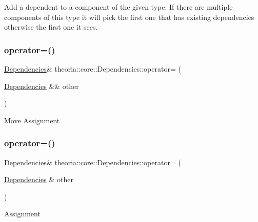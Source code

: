 Add a dependent to a component of the given type. If there are multiple components of this type it will pick the first one that has existing dependencies otherwise the first one it sees. \mbox{\label{classtheoria_1_1core_1_1Dependencies_ac1b06e338d69428c95de7851dfc43935}} 
\subsubsection{\texorpdfstring{operator=()}{operator=()}\hspace{0.1cm}{\footnotesize\ttfamily [1/2]}}
{\footnotesize\ttfamily \hyperlink{classtheoria_1_1core_1_1Dependencies}{Dependencies}\& theoria\+::core\+::\+Dependencies\+::operator= (\begin{DoxyParamCaption}\item[{\hyperlink{classtheoria_1_1core_1_1Dependencies}{Dependencies} \&\&}]{other }\end{DoxyParamCaption})\hspace{0.3cm}{\ttfamily [default]}}

Move Assignment \mbox{\label{classtheoria_1_1core_1_1Dependencies_ac0c7b2c350c5e904732ed07b13852c21}} 
\subsubsection{\texorpdfstring{operator=()}{operator=()}\hspace{0.1cm}{\footnotesize\ttfamily [2/2]}}
{\footnotesize\ttfamily \hyperlink{classtheoria_1_1core_1_1Dependencies}{Dependencies}\& theoria\+::core\+::\+Dependencies\+::operator= (\begin{DoxyParamCaption}\item[{\hyperlink{classtheoria_1_1core_1_1Dependencies}{Dependencies} \&}]{other }\end{DoxyParamCaption})\hspace{0.3cm}{\ttfamily [default]}}

Assignment \mbox{\label{classtheoria_1_1core_1_1Dependencies_afba2a36945b9320b793ff8f3350ce468}} 
